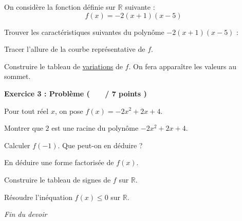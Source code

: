 \documentclass[12pt,a4paper]{exam}
\begin{document}
\vspace{5pt}
\noindent
On considère la fonction définie sur $\mathbb{R}$ suivante :
\[
f(x) = -2(x+1)(x-5)
\]

\begin{questions}

\question Trouver les caractéristiques suivantes du polynôme 
$-2(x+1)(x-5)$ :

\question[1] Tracer l'allure de la courbe représentative de $f$.


\question[2] Construire le tableau de \underline{variations} de $f$. On fera 
apparaître les valeurs au sommet.

\end{questions}

\vspace{0.5cm}

\noindent
\textbf{Exercice 3 : Problème ( \ \ \ / 7 points )}

\vspace{5pt}
\noindent
Pour tout réel $x$, on pose $f(x) = -2x^2 + 2x + 4$.

\begin{questions}

\question[1] Montrer que $2$ est une racine du 
polynôme $-2x^2 + 2x + 4$.

\question[1] Calculer $f(-1)$. Que peut-on en déduire ?

\question[2] En déduire une forme factorisée de $f(x)$.

\question[2] Construire le tableau de signes de $f$ sur $\mathbb{R}$.

\question[1] Résoudre l'inéquation $f(x) \leq 0$ sur $\mathbb{R}$.

\end{questions}

\vspace{0.5cm}

\begin{center}
    \textit{Fin du devoir}
\end{center}
\end{document}
